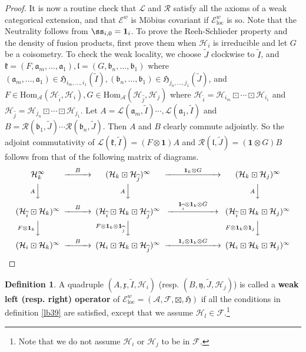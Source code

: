 \documentclass[12pt,a4paper]{article}
\theoremstyle{definition}
\newtheorem{df}{Definition}[subsection]
\theoremstyle{plain}
\newcommand{\fk}{\mathfrak}
\newcommand{\mc}{\mathcal}
\newcommand{\wtd}{\widetilde}
\newcommand{\wht}{\widehat}
\newcommand{\id}{\mathbf{1}}
\newcommand{\Hom}{\mathrm{Hom}}
\newcommand{\loc}{\mathrm{loc}}
\newcommand{\scr}{\mathscr}
\numberwithin{equation}{subsection}
\begin{document}
\begin{proof}
It is now a routine check that $\mc L$ and $\mc R$ satisfy all the axioms of a weak categorical extension, and that $\scr E^w$ is M\"obius covariant if $\scr E^w_\loc$ is so. Note that the Neutrality follows from $\ss_{i,0}=\id_i$. To prove the Reeh-Schlieder property and the density of fusion products, first prove them when $\mc H_i$ is irreducible and let $G$ be a coisometry.  To check the weak locality, we choose $\wtd J$ clockwise to $\wtd I$, and $\fk k=(F,\fk a_m,\dots,\fk a_1),\fk l=(G,\fk b_n,\dots,\fk b_1)$ where $(\fk a_m,\dots,\fk a_1)\in \fk H_{i_m,\dots,i_1}(\wtd I),(\fk b_n,\dots,\fk b_1)\in \fk H_{j_n,\dots,j_1}(\wtd J)$, and $F\in\Hom_{\mc A}(\mc H_{\wht i},\mc H_i),G\in\Hom_{\mc A}(\mc H_{\wht j},\mc H_j)$ where $\mc H_{\wht i}=\mc H_{i_m}\boxdot\cdots\boxdot\mc H_{i_1}$ and $\mc H_{\wht j}=\mc H_{j_n}\boxdot\cdots\boxdot\mc H_{j_1}$. Let $A=\mc L(\fk a_m,\wtd I)\cdots,\mc L(\fk a_1,\wtd I)$ and $B=\mc R(\fk b_1,\wtd J)\cdots\mc R(\fk b_n,\wtd J)$. Then $A$ and $B$ clearly commute adjointly. So the adjoint commutativity of $\mc L(\fk k,\wtd I)=(F\otimes\id)A$ and $\mc R(\fk l,\wtd J)=(\id\otimes G)B$ follows from that of the following matrix of diagrams.
\begin{align*}
\begin{CD}
\mc H_k^\infty @>\quad B \quad >> (\mc H_k\boxdot\mc H_{\wht j})^\infty @> ~~~~~~  \id_k\otimes G ~~~~~~  >> (\mc H_k\boxdot\mc H_j)^\infty\\
@V A  VV @V A VV @V A VV\\
(\mc H_{\wht i}\boxdot\mc H_k)^\infty @> \quad  B \quad  >> (\mc H_{\wht i}\boxdot\mc H_k\boxdot\mc H_{\wht j})^\infty   @> \quad \id_{\wht i}\otimes\id_k\otimes G\quad  >>(\mc H_{\wht i}\boxdot\mc H_k\boxdot\mc H_j)^\infty\\
@V F\otimes\id_k  VV @V  F\otimes\id_k\otimes\id_{\wht j} VV @V  F\otimes\id_k\otimes\id_j  VV\\
(\mc H_i\boxdot\mc H_k)^\infty @> \quad B \quad  >>(\mc H_i\boxdot\mc H_k\boxdot\mc H_{\wht j})^\infty  @>~~~~  \id_i\otimes\id_k\otimes G~~~~  >>(\mc H_i\boxdot\mc H_k\boxdot\mc H_j)^\infty
\end{CD}
\end{align*} 
\end{proof}


\begin{df}
A quadruple $(A,\fk x,\wtd I,\mc H_i)$ (resp. $(B,\fk y,\wtd J,\mc H_j)$) is called a \textbf{weak left (resp. right) operator} of $\scr E^w_\loc=(\mc A,\mc F,\boxtimes,\fk H)$ if all the conditions in definition \ref{lb39} are satisfied, except that we assume $\mc H_l\in\mc F$.\footnote{Note that we do not assume $\mc H_i$ or $\mc H_j$ to be in $\mc F$.}
\end{df}
\end{document}
